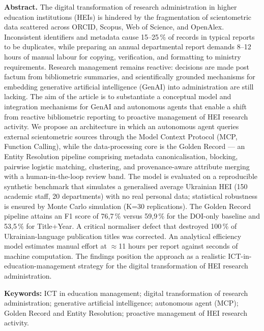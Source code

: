\textbf{Abstract.} The digital transformation of research administration in higher education institutions (HEIs) is hindered by the fragmentation of scientometric data scattered across ORCID, Scopus, Web of Science, and OpenAlex. Inconsistent identifiers and metadata cause 15--25\,\% of records in typical reports to be duplicates, while preparing an annual departmental report demands 8--12 hours of manual labour for copying, verification, and formatting to ministry requirements. Research management remains reactive: decisions are made post factum from bibliometric summaries, and scientifically grounded mechanisms for embedding generative artificial intelligence (GenAI) into administration are still lacking. The aim of the article is to substantiate a conceptual model and integration mechanisms for GenAI and autonomous agents that enable a shift from reactive bibliometric reporting to proactive management of HEI research activity. We propose an architecture in which an autonomous agent queries external scientometric sources through the Model Context Protocol (MCP, Function Calling), while the data-processing core is the Golden Record --- an Entity Resolution pipeline comprising metadata canonicalisation, blocking, pairwise logistic matching, clustering, and provenance-aware attribute merging with a human-in-the-loop review band. The model is evaluated on a reproducible synthetic benchmark that simulates a generalised average Ukrainian HEI (150 academic staff, 20 departments) with no real personal data; statistical robustness is ensured by Monte Carlo simulation (K=30 replications). The Golden Record pipeline attains an F1 score of 76,7\,\% versus 59,9\,\% for the DOI-only baseline and 53,5\,\% for Title+Year. A critical normaliser defect that destroyed 100\,\% of Ukrainian-language publication titles was corrected. An analytical efficiency model estimates manual effort at $\approx$11 hours per report against seconds of machine computation. The findings position the approach as a realistic ICT-in-education-management strategy for the digital transformation of HEI research administration.

\textbf{Keywords:} ICT in education management; digital transformation of research administration; generative artificial intelligence; autonomous agent (MCP); Golden Record and Entity Resolution; proactive management of HEI research activity.
